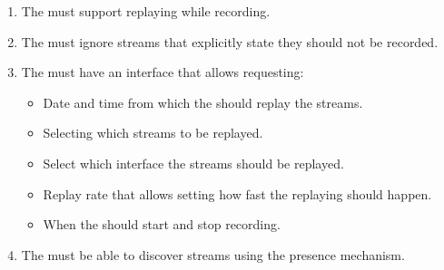 \begin{enumerate}[ref=R-A-P-\arabic* on P.\thepage]
	\item The  must support replaying while recording. \label{req:a:h:replaywhilerecord}
	\item The  must ignore streams that explicitly state they should not be recorded.
	\item The  must have an interface that allows requesting:
	\begin{itemize}
		\item Date and time from which the  should replay the streams.
		\item Selecting which streams to be replayed.
		\item Select which interface the streams should be replayed.
		\item Replay rate that allows setting how fast the replaying should happen.
		\item When the  should start and stop recording.
	\end{itemize}
	\item The  must be able to discover streams using the presence mechanism.
\end{enumerate}

